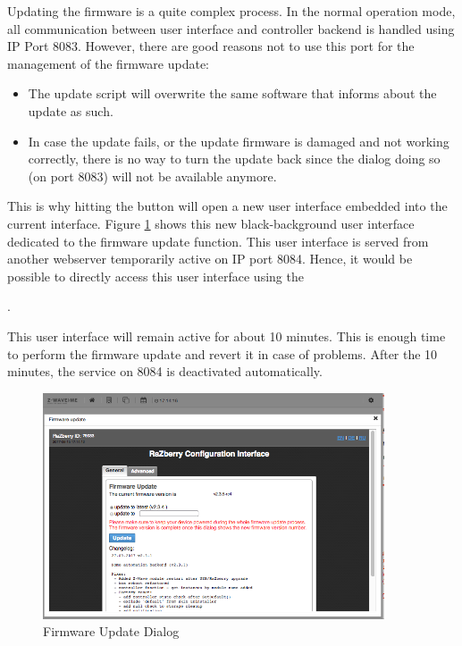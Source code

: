 Updating the firmware is a quite complex process. In the normal operation mode, all 
communication between user interface and controller backend is handled using IP Port 8083. 
However, there are good reasons not to use this port for the management of the firmware update:

\begin{itemize}
\item The update script will overwrite the same software that informs about the update as such.
\item In case the update fails, or the update firmware is damaged and not working correctly, 
there is no way to turn the update back since the dialog doing so (on port 8083) will not 
be available anymore.
\end{itemize}

This is why hitting the button  will open a new user interface embedded 
into the current interface. Figure \ref{shui77} shows this new black-background user 
interface dedicated to the firmware update function. This user interface is served from 
another webserver temporarily active on IP port 8084. Hence, it would be possible to 
directly access this user interface using the


.


This user interface will remain active for about 10 minutes. This is enough time to perform
 the firmware update and revert it in case of problems. After the 10 minutes, the service on 
 8084 is deactivated automatically.

\begin{figure}
\begin{center}
\includegraphics[width=0.9\textwidth]{pngs/cap4/shui77.png}
\caption{Firmware Update Dialog}
\label{shui77}
\end{center}
\end{figure}

